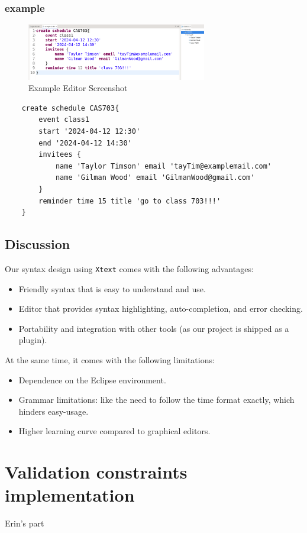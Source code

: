 \documentclass[12pt, letterpaper, twoside]{article}
\begin{document}
\subsubsection{example}
\begin{figure}[H]
    \centering
    \includegraphics[width=0.7\textwidth]{editor_example.png}
    \caption{Example Editor Screenshot}
    \label{fig:class-diagram}
\end{figure}

\begin{verbatim}
    create schedule CAS703{
        event class1 
        start '2024-04-12 12:30'
        end '2024-04-12 14:30'
        invitees {
            name 'Taylor Timson' email 'tayTim@examplemail.com'
            name 'Gilman Wood' email 'GilmanWood@gmail.com'
        }
        reminder time 15 title 'go to class 703!!!'
    }
\end{verbatim}

\subsection{Discussion}
Our syntax design using \texttt{Xtext} comes with the following advantages:
\begin{itemize}
    \item Friendly syntax that is easy to understand and use.
    \item Editor that provides syntax highlighting, auto-completion, and error checking.
    \item Portability and integration with other tools (as our project is shipped as a plugin). 
\end{itemize}
At the same time, it comes with the following limitations:
\begin{itemize}
    \item Dependence on the Eclipse environment.
    \item Grammar limitations: like the need to follow the time format exactly, which hinders easy-usage.
    \item Higher learning curve compared to graphical editors.
\end{itemize}


\newpage
\section{Validation constraints implementation}
Erin's part
\end{document}
